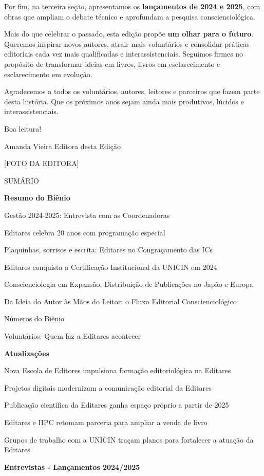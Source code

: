 Por fim, na terceira seção, apresentamos os \textbf{lançamentos de 2024 e 2025}, com obras que ampliam o debate técnico e aprofundam a pesquisa conscienciológica.

Mais do que celebrar o passado, esta edição propõe \textbf{um olhar para o futuro}. Queremos inspirar novos autores, atrair mais voluntários e consolidar práticas editoriais cada vez mais qualificadas e interassistenciais. Seguimos firmes no propósito de transformar ideias em livros, livros em esclarecimento e esclarecimento em evolução.

Agradecemos a todos os voluntários, autores, leitores e parceiros que fazem parte desta história. Que os próximos anos sejam ainda mais produtivos, lúcidos e interassistenciais.

Boa leitura!

Amanda Vieira\textbf{\hfill\break
} Editora desta Edição

{[}FOTO DA EDITORA{]}

SUMÁRIO

\textbf{Resumo do Biênio}

Gestão 2024-2025: Entrevista com as Coordenadoras

Editares celebra 20 anos com programação especial

Plaquinhas, sorrisos e escrita: Editares no Congraçamento das ICs

Editares conquista a Certificação Institucional da UNICIN em 2024

Conscienciologia em Expansão: Distribuição de Publicações no Japão e Europa

Da Ideia do Autor às Mãos do Leitor: o Fluxo Editorial Conscienciológico

Números do Biênio

Voluntários: Quem faz a Editares acontecer

\textbf{Atualizações}

Nova Escola de Editores impulsiona formação editoriológica na Editares

Projetos digitais modernizam a comunicação editorial da Editares

Publicação científica da Editares ganha espaço próprio a partir de 2025

Editares e IIPC retomam parceria para ampliar a venda de livro

Grupos de trabalho com a UNICIN traçam planos para fortalecer a atuação da Editares

\textbf{Entrevistas - Lançamentos 2024/2025}


